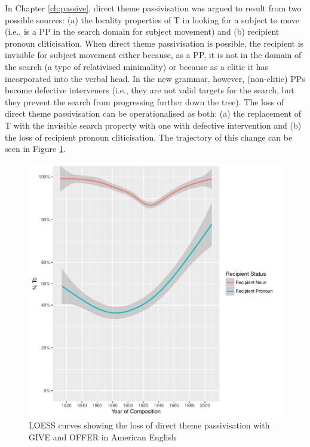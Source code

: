 	In Chapter \ref{ch:passive}, direct theme passivisation was argued to result from two possible sources: (a) the locality properties of T in looking for a subject to move (i.e., is a PP in the search domain for subject movement) and (b) recipient pronoun cliticisation. When direct theme passivisation is possible, the recipient is invisible for subject movement either because, as a PP, it is not in the domain of the search (a type of relativised minimality) or because as a clitic it has incorporated into the verbal head. In the new grammar, however, (non-clitic) PPs become defective interveners (i.e., they are not valid targets for the search, but they prevent the search from progressing further down the tree). The loss of direct theme passivisation can be operationalised as both: (a) the replacement of T with the invisible search property with one with defective intervention and (b) the loss of recipient pronoun cliticisation. The trajectory of this change can be seen in Figure \ref{fig:loss-of-dt-in-amen}.

	\begin{figure}[ht!]
		\includegraphics[width=\linewidth]{../images/directtheme-am}
		\caption{LOESS curves showing the loss of direct theme passivisation with GIVE and OFFER in American English}
		\label{fig:loss-of-dt-in-amen}
	\end{figure}

